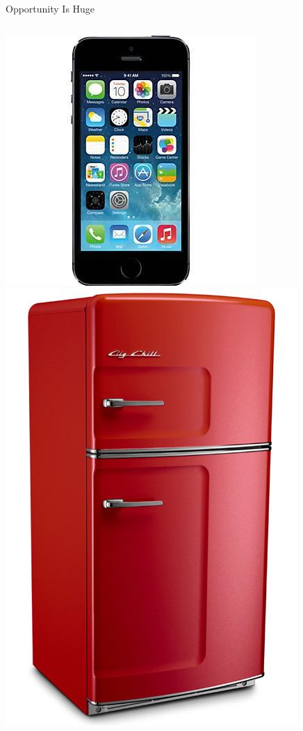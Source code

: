 \documentclass[xcolor=pdflatex,dvipsnames,table]{beamer}
\begin{document}
\begin{frame}[fragile]{Opportunity Is Huge}
\begin{columns}
\begin{center}
\includegraphics[height=0.3\textheight]{figs/smart-phone.jpeg} 
\includegraphics[height=0.3\textheight]{figs/red-refrigerator-big-chill.jpg} \\

\end{center}
\end{columns}
\end{frame}
\end{document}
